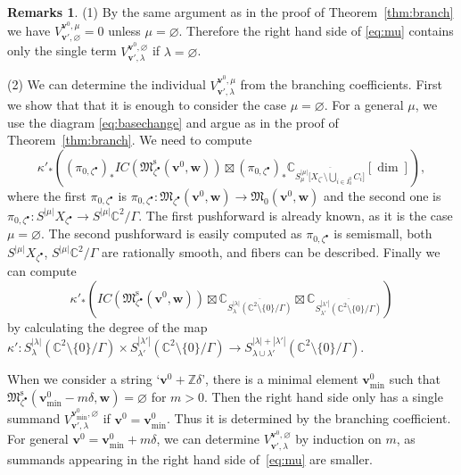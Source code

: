 \documentclass[pdftex]{sigma}
\theoremstyle{definition}
\newtheorem{Remarks}[equation]{Remarks}
\numberwithin{equation}{section}
\newcommand{\thmref}[1]{Theorem~\ref{#1}}
\newcommand{\C}{{\mathbb C}}
\newcommand{\Z}{{\mathbb Z}}
\newcommand{\M}{{\mathfrak M}} %
\newcommand{\Mreg}{\M^{\operatorname{s}}}
\newcommand{\bv}{{\mathbf v}} %
\newcommand{\bw}{{\mathbf w}} %
\begin{document}
\begin{Remarks}
  (1) By the same argument as in the proof of \thmref{thm:branch} we
  have $V^{\bv^0,\mu}_{\bv',\varnothing} = 0$ unless
  $\mu=\varnothing$. Therefore the right hand side of \eqref{eq:mu}
  contains only the single term $V^{\bv^0,\varnothing}_{\bv',\lambda}$ if
  $\lambda = \varnothing$.

  (2) We can determine the individual $V^{\bv^0,\mu}_{\bv',\lambda}$
  from the branching coef\/f\/icients. First we show that that it is
  enough to consider the case $\mu=\varnothing$.
%
For a general $\mu$, we use the diagram \eqref{eq:basechange} and
argue as in the proof of \thmref{thm:branch}. We need to compute
\begin{equation*}
   \kappa'_*\left((\pi_{0,\zeta^\bullet})_*
   IC(\Mreg_{\zeta^\bullet}(\bv^0,\bw))\boxtimes
   (\pi_{0,\zeta^\bullet})_*
   \C_{\overline{S^{|\mu|}_\mu \big[X_{\zeta^\circ}\setminus
       \bigcup_{i\in I_0^0} C_i \big]}}[\dim]\right),
\end{equation*}
where the f\/irst $\pi_{0,\zeta^\bullet}$ is
$\pi_{0,\zeta^\bullet}\colon \M_{\zeta^\bullet}(\bv^0,\bw)
\to \M_0(\bv^0,\bw)$ and the second one is
$\pi_{0,\zeta^\bullet}\colon S^{|\mu|} X_{\zeta^\bullet}\to
S^{|\mu|} \C^2/\Gamma$. The f\/irst pushforward is already known, as
it is the case $\mu=\varnothing$. The second pushforward is easily
computed as $\pi_{0,\zeta^\bullet}$ is semismall, both $S^{|\mu|}
X_{\zeta^\bullet}$, $S^{|\mu|} \C^2/\Gamma$ are rationally smooth, and
f\/ibers can be described. Finally we can compute
\begin{equation*}
   \kappa'_*\left(IC(\Mreg_{\zeta^\bullet}(\bv^0,\bw))\boxtimes
   \C_{\overline{S^{|\lambda|}_\lambda(\C^2\setminus\{0\}/\Gamma)}}
   \boxtimes
   \C_{\overline{S^{|\lambda'|}_{\lambda'}(\C^2\setminus\{0\}/\Gamma)}}\right)
\end{equation*}
by calculating the degree of the map
\(
  \kappa'\colon
  S^{|\lambda|}_\lambda(\C^2\setminus\{0\}/\Gamma) \times
  S^{|\lambda'|}_{\lambda'}(\C^2\setminus\{0\}/\Gamma)
  \to S^{|\lambda|+|\lambda'|}_{\lambda\cup\lambda'}
  (\C^2\setminus\{0\}/\Gamma).
\)

When we consider a string `$\bv^0+\Z\delta$', there is a minimal
element $\bv^0_{\min}$ such that
\(
   \Mreg_{\zeta^\bullet}(\bv^0_{\min}-m\delta,\bw) = \varnothing
\)
for $m > 0$. Then the right hand side only has a single summand
$V^{\bv^0_{\min},\varnothing}_{\bv',\lambda}$ if $\bv^0 =
\bv^0_{\min}$. Thus it is determined by the branching coef\/f\/icient.
For general $\bv^0 = \bv^0_{\min} + m\delta$, we can determine
\(
   V_{\bv',\lambda}^{\bv^0,\varnothing}
\)
by induction on $m$, as summands appearing in the right hand side of~\eqref{eq:mu} are smaller.


\end{Remarks}
\end{document}
